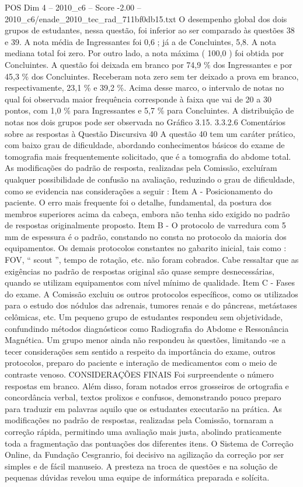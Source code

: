\begin{textsample}{POS Dim 4 – 2010\_c6 – Score -2.00 – 2010\_c6/enade\_2010\_tec\_rad\_711bf0db15.txt}
O desempenho global dos dois grupos de estudantes, nessa questão, foi inferior ao ser comparado às questões 38 e 39.
A nota média de Ingressantes foi 0,6 ; já a de Concluintes, 5,8.
A nota mediana total foi zero.
Por outro lado, a nota máxima ( 100,0 ) foi obtida por Concluintes.
A questão foi deixada em branco por 74,9 \% dos Ingressantes e por 45,3 \% dos Concluintes.
Receberam nota zero sem ter deixado a prova em branco, respectivamente, 23,1 \% e 39,2 \%.
Acima desse marco, o intervalo de notas no qual foi observada maior frequência corresponde à faixa que vai de 20 a 30 pontos, com 1,0 \% para Ingressantes e 5,7 \% para Concluintes.
A distribuição de notas nos dois grupos pode ser observada no Gráfico 3.15. 3.3.2.6 Comentários sobre as respostas à Questão Discursiva 40 A questão 40 tem um caráter prático, com baixo grau de dificuldade, abordando conhecimentos básicos do exame de tomografia mais frequentemente solicitado, que é a tomografia do abdome total.
As modificações do padrão de resposta, realizadas pela Comissão, excluíram qualquer possibilidade de confusão na avaliação, reduzindo o grau de dificuldade, como se evidencia nas considerações a seguir : Item A - Posicionamento do paciente.
O erro mais frequente foi o detalhe, fundamental, da postura dos membros superiores acima da cabeça, embora não tenha sido exigido no padrão de respostas originalmente proposto.
Item B - O protocolo de varredura com 5 mm de espessura é o padrão, constando no consta no protocolo da maioria dos equipamentos.
Os demais protocolos constantes no gabarito inicial, tais como : FOV, “ scout ”, tempo de rotação, etc. não foram cobrados.
Cabe ressaltar que as exigências no padrão de respostas original são quase sempre desnecessárias, quando se utilizam equipamentos com nível mínimo de qualidade.
Item C - Fases do exame.
A Comissão excluiu os outros protocolos específicos, como os utilizados para o estudo dos nódulos das adrenais, tumores renais e do pâncreas, metástases celômicas, etc.
Um pequeno grupo de estudantes respondeu sem objetividade, confundindo métodos diagnósticos como Radiografia do Abdome e Ressonância Magnética.
Um grupo menor ainda não respondeu às questões, limitando -se a tecer considerações sem sentido a respeito da importância do exame, outros protocolos, preparo do paciente e interação de medicamentos com o meio de contraste venoso.
CONSIDERAÇÕES FINAIS Foi surpreendente o número respostas em branco.
Além disso, foram notados erros grosseiros de ortografia e concordância verbal, textos prolixos e confusos, demonstrando pouco preparo para traduzir em palavras aquilo que os estudantes executarão na prática.
As modificações no padrão de respostas, realizadas pela Comissão, tornaram a correção rápida, permitindo uma avaliação mais justa, abolindo praticamente toda a fragmentação das pontuações dos diferentes itens.
O Sistema de Correção Online, da Fundação Cesgranrio, foi decisivo na agilização da correção por ser simples e de fácil manuseio.
A presteza na troca de questões e na solução de pequenas dúvidas revelou uma equipe de informática preparada e solícita.

\end{textsample}
